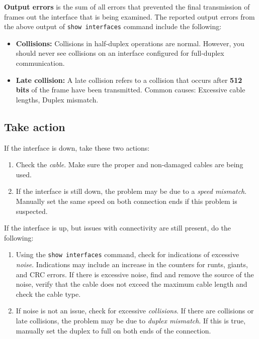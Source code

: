 \textbf{Output errors} is the sum of all errors that prevented the final transmission of frames out the interface that is being examined. The reported output errors from the above output of \verb|show interfaces| command include the following:

\begin{itemize}
\item \textbf{Collisions:} Collisions in half-duplex operations are normal. However, you should never see collisions on an interface configured for full-duplex communication.

\item \textbf{Late collision:} A late collision refers to a collision that occurs after \textbf{512 bits} of the frame have been transmitted. Common causes: Excessive cable lengths, Duplex mismatch.
\end{itemize}

\subsection{Take action}

If the interface is down, take these two actions:

\begin{enumerate}
\item Check the \emph{cable}. Make sure the proper and non-damaged cables are being used.

\item If the interface is still down, the problem may be due to a \emph{speed mismatch}. Manually set the same speed on both connection ends if this problem is suspected.
\end{enumerate}

If the interface is up, but issues with connectivity are still present, do the following:

\begin{enumerate}
\item Using the \verb|show interfaces| command, check for indications of excessive \emph{noise}. Indications may include an increase in the counters for runts, giants, and CRC errors. If there is excessive noise, find and remove the source of the noise, verify that the cable does not exceed the maximum cable length and check the cable type.

\item If noise is not an issue, check for excessive \emph{collisions}. If there are collisions or late collisions, the problem may be due to \emph{duplex mismatch}. If this is true, manually set the duplex to full on both ends of the connection.
\end{enumerate}
